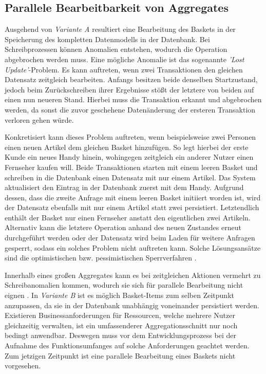 \subsection{Parallele Bearbeitbarkeit von Aggregates}

Ausgehend von \emph{Variante A} resultiert eine Bearbeitung des Baskets in der Speicherung des kompletten Datenmodells in der Datenbank. Bei Schreibprozessen können Anomalien entstehen, wodurch die Operation abgebrochen werden muss. Eine mögliche Anomalie ist das sogenannte \emph{'\Gls{Lost Update}'}-Problem. Es kann auftreten, wenn zwei Transaktionen den gleichen Datensatz zeitgleich bearbeiten. Anfangs besitzen beide denselben Startzustand, jedoch beim Zurückschreiben ihrer Ergebnisse stößt der letztere von beiden auf einen nun neueren Stand. Hierbei muss die Transaktion erkannt und abgebrochen werden, da sonst die zuvor geschehene Datenänderung der ersteren Transaktion verloren gehen würde.

Konkretisiert kann dieses Problem auftreten, wenn beispielsweise zwei Personen einen neuen Artikel dem gleichen Basket hinzufügen. So legt hierbei der erste Kunde ein neues Handy hinein, wohingegen zeitgleich ein anderer Nutzer einen Fernseher kaufen will. Beide Transaktionen starten mit einem leeren Basket und schreiben in die Datenbank einen Datensatz mit nur einem Artikel. Das System aktualisiert den Eintrag in der Datenbank zuerst mit dem Handy. Aufgrund dessen, dass die zweite Anfrage mit einem leeren Basket initiiert worden ist, wird der Datensatz ebenfalls mit nur einem Artikel statt zwei persistiert. Letztendlich enthält der Basket nur einen Fernseher anstatt den eigentlichen zwei Artikeln. Alternativ kann die letztere Operation anhand des neuen Zustandes erneut durchgeführt werden oder der Datensatz wird beim Laden für weitere Anfragen gesperrt, sodass ein solches Problem nicht auftreten kann. Solche Lösungsansätze sind die optimistischen bzw. pessimistischen Sperrverfahren \cite[S. 385f.]{Vernon.2015}.

Innerhalb eines großen Aggregates kann es bei zeitgleichen Aktionen vermehrt zu Schreibanomalien kommen, wodurch sie sich für parallele Bearbeitung nicht eignen \cite[S. 2]{Vernon.2011}. In \emph{Variante B} ist es möglich Basket-Items zum selben Zeitpunkt anzupassen, da sie in der Datenbank unabhängig voneinander persistiert werden. Existieren Businessanforderungen für Ressourcen, welche mehrere Nutzer gleichzeitig verwalten, ist ein umfassenderer Aggregationsschnitt nur noch bedingt anwendbar. Deswegen muss vor dem Entwicklungsprozess bei der Aufnahme des Funktionsumfanges auf solche Anforderungen geachtet werden. Zum jetzigen Zeitpunkt ist eine parallele Bearbeitung eines Baskets nicht vorgesehen.

